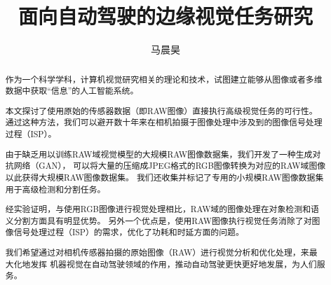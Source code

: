 \documentclass[winfonts]{njuthesis}
\title{面向自动驾驶的边缘视觉任务研究}
\author{马晨昊}
\begin{document}
\maketitle

\begin{abstract}
  
  作为一个科学学科，计算机视觉研究相关的理论和技术，试图建立能够从图像或者多维数据中获取“信息”的人工智能系统。
  
  本文探讨了使用原始的传感器数据（即RAW图像）直接执行高级视觉任务的可行性。
  通过这种方法，我们可以避开数十年来在相机拍摄于图像处理中涉及到的图像信号处理过程（ISP）。
  
  由于缺乏用以训练RAW域视觉模型的大规模RAW图像数据集，我们开发了一种生成对抗网络（GAN），
  可以将大量的压缩成JPEG格式的RGB图像转换为对应的RAW域图像以此获得大规模RAW图像数据集。
  我们还收集并标记了专用的小规模RAW图像数据集用于高级检测和分割任务。
  
  经实验证明，与使用RGB图像进行视觉处理相比，RAW域的图像处理在对象检测和语义分割方面具有明显优势。
  另外一个优点是，使用RAW图像执行视觉任务消除了对图像信号处理过程（ISP）的需求，优化了功耗和时延方面的问题。
  
  我们希望通过对相机传感器拍摄的原始图像（RAW）进行视觉分析和优化处理，来最大化地发挥
  机器视觉在自动驾驶领域的作用，推动自动驾驶更快更好地发展，为人们服务。

\end{abstract}
\end{document}
